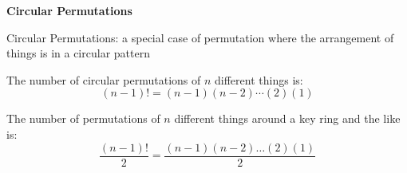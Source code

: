 \begin{center}
\textbf{Circular Permutations
}
\end{center}

\vspace*{1ex}

Circular Permutations: a special case of permutation where the arrangement of things is in a circular pattern

\vspce 

The number of circular permutations of $n$ different things is: 
\[
(n-1)!=(n-1)(n-2) \cdots (2)(1) 
\] 

The number of permutations of $n$ different things around a key ring and the like is: 
\[
\displaystyle \frac{(n -1)!}{2} = \displaystyle \frac{(n -1)(n - 2) \ldots (2)(1)}{2} 
\] 


